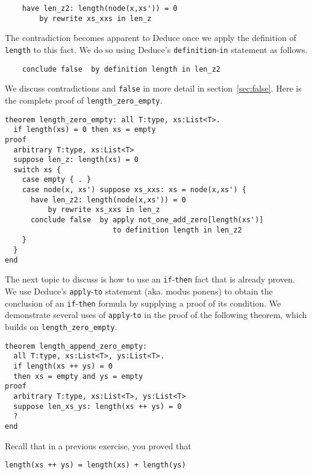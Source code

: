 \documentclass[12pt]{article}
\begin{document}
\begin{verbatim}
    have len_z2: length(node(x,xs')) = 0
        by rewrite xs_xxs in len_z
\end{verbatim}

The contradiction becomes apparent to Deduce once we apply the
definition of \texttt{length} to this fact. We do so using Deduce's
\texttt{definition}-\texttt{in} statement as follows. 

\begin{verbatim}
    conclude false  by definition length in len_z2
\end{verbatim}

\noindent We discuss contradictions and \texttt{false} in more detail
in section~\ref{sec:false}.
%
Here is the complete proof of \texttt{length\_zero\_empty}.

\begin{verbatim}
theorem length_zero_empty: all T:type, xs:List<T>.
  if length(xs) = 0 then xs = empty
proof
  arbitrary T:type, xs:List<T>
  suppose len_z: length(xs) = 0
  switch xs {
    case empty { . }
    case node(x, xs') suppose xs_xxs: xs = node(x,xs') {
      have len_z2: length(node(x,xs')) = 0
          by rewrite xs_xxs in len_z
      conclude false  by apply not_one_add_zero[length(xs')]
                         to definition length in len_z2
    }
  }
end
\end{verbatim}

The next topic to discuss is how to use an \texttt{if}-\texttt{then}
fact that is already proven.  We use Deduce's
\texttt{apply}-\texttt{to} statement (aka. modus ponens) to obtain the
conclusion of an \texttt{if}-\texttt{then} formula by supplying a
proof of its condition.  We demonstrate several uses of
\texttt{apply}-\texttt{to} in the proof of the following theorem,
which builds on \texttt{length\_zero\_empty}.

\begin{verbatim}
theorem length_append_zero_empty: 
  all T:type, xs:List<T>, ys:List<T>.
  if length(xs ++ ys) = 0
  then xs = empty and ys = empty
proof
  arbitrary T:type, xs:List<T>, ys:List<T>
  suppose len_xs_ys: length(xs ++ ys) = 0
  ?
end
\end{verbatim}

Recall that in a previous exercise, you proved that

\begin{verbatim}
length(xs ++ ys) = length(xs) + length(ys)
\end{verbatim}
\end{document}
